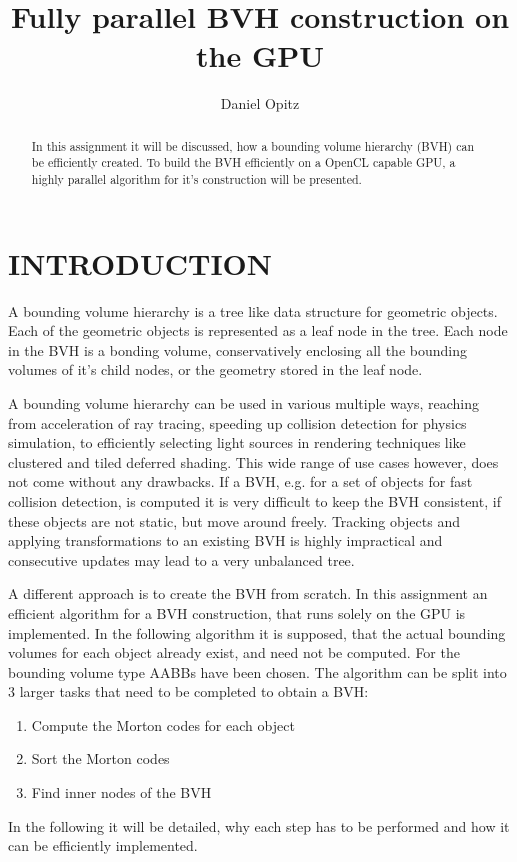 \documentclass[letterpaper, 10 pt, conference]{IEEEconf}  %
\title{\LARGE \bf
Fully parallel BVH construction on the GPU
}
\author{Daniel Opitz}
\begin{document}
\maketitle
\thispagestyle{empty}
\pagestyle{empty}


\begin{abstract}

In this assignment it will be discussed, how a bounding volume hierarchy (BVH) can be efficiently created. To build the BVH efficiently on a OpenCL capable GPU, a highly parallel algorithm for it's construction will be presented.

\end{abstract}


\section{INTRODUCTION}

A bounding volume hierarchy is a tree like data structure for geometric objects. Each of the geometric objects is represented as a leaf node in the tree. Each node in the BVH is a bonding volume, conservatively enclosing all the bounding volumes of it's child nodes, or the geometry stored in the leaf node.

A bounding volume hierarchy can be used in various multiple ways, reaching from acceleration of ray tracing, speeding up collision detection for physics simulation, to efficiently selecting light sources in rendering techniques like clustered and tiled deferred shading. This wide range of use cases however, does not come without any drawbacks. If a BVH, e.g. for a set of objects for fast collision detection, is computed it is very difficult to keep the BVH consistent, if these objects are not static, but move around freely. Tracking objects and applying transformations to an existing BVH is highly impractical and consecutive updates may lead to a very unbalanced tree. 

A different approach is to create the BVH from scratch. In this assignment an efficient algorithm for a BVH construction, that runs solely on the GPU is implemented. In the following algorithm it is supposed, that the actual bounding volumes for each object already exist, and need not be computed. For the bounding volume type AABBs have been chosen. The algorithm can be split into 3 larger tasks that need to be completed to obtain a BVH:
\begin{enumerate}
  \item Compute the Morton codes for each object
  \item Sort the Morton codes
  \item Find inner nodes of the BVH
\end{enumerate}
In the following it will be detailed, why each step has to be performed and how it can be efficiently implemented.
\end{document}
